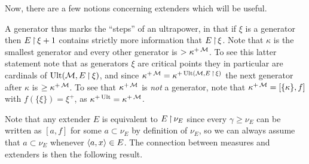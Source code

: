 Now, there are a few notions concerning extenders which will be useful.


A generator thus marks the ``steps'' of an ultrapower, in that if $\xi$ is a generator then $E\operatorname{\upharpoonright}\xi+1$ contains strictly more information that $E\operatorname{\upharpoonright}\xi$. Note that $\kappa$ is the smallest generator and every other generator is $>\kappa^{+\operatorname{\mathcal{M}}}$. To see this latter statement note that as generators $\xi$ are critical points they in particular are cardinals of $\operatorname{Ult}(\operatorname{\mathcal{M}},E\operatorname{\upharpoonright}\xi)$, and since $\kappa^{+\operatorname{\mathcal{M}}}=\kappa^{+\operatorname{Ult}(\operatorname{\mathcal{M}},E\operatorname{\upharpoonright}\xi)}$ the next generator after $\kappa$ is $\geq\kappa^{+\operatorname{\mathcal{M}}}$. To see that $\kappa^{+\operatorname{\mathcal{M}}}$ is \textit{not} a generator, note that $\kappa^{+\operatorname{\mathcal{M}}}=[\{\kappa\},f]$ with $f(\{\xi\})=\xi^+$, as $\kappa^{+\operatorname{Ult}}=\kappa^{+\operatorname{\mathcal{M}}}$.


Note that any extender $E$ is equivalent to $E\operatorname{\upharpoonright}\nu_E$ since every $\gamma\geq\nu_E$ can be written as $[a,f]$ for some $a\subset\nu_E$ by definition of $\nu_E$, so we can always assume that $a\subset\nu_E$ whenever $\langle a,x\rangle\in E$. The connection between measures and extenders is then the following result.


